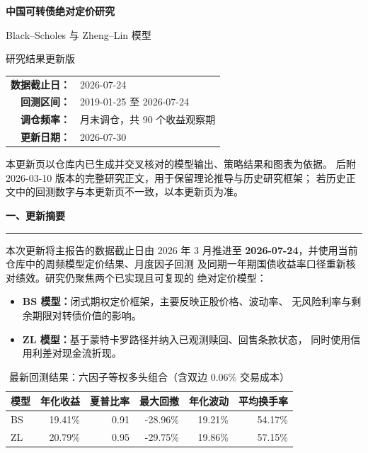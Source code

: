 \documentclass[11pt,a4paper]{ctexart}
\newcommand{\sectionbar}[1]{%
  \vspace{0.4em}
  {\color{navy}\Large\bfseries #1}\par
  \vspace{0.2em}
  {\color{blue}\rule{\textwidth}{1.2pt}}\par
}
\begin{document}
\begin{titlepage}
  \centering
  \vspace*{2.1cm}
  {\color{navy}\Huge\bfseries 中国可转债绝对定价研究\par}
  \vspace{0.45cm}
  {\color{blue}\LARGE Black--Scholes 与 Zheng--Lin 模型\par}
  \vspace{0.9cm}
  {\Large 研究结果更新版\par}
  \vspace{1.5cm}

  \renewcommand{\arraystretch}{1.45}
  \begin{tabular}{>{\bfseries}rl}
    数据截止日： & 2026-07-24 \\
    回测区间： & 2019-01-25 至 2026-07-24 \\
    调仓频率： & 月末调仓，共 90 个收益观察期 \\
    更新日期： & 2026-07-30 \\
  \end{tabular}

  \vfill
  \begin{minipage}{0.88\textwidth}
    \small\color{muted}
    本更新页以仓库内已生成并交叉核对的模型输出、策略结果和图表为依据。
    后附 2026-03-10 版本的完整研究正文，用于保留理论推导与历史研究框架；
    若历史正文中的回测数字与本更新页不一致，以本更新页为准。
  \end{minipage}
\end{titlepage}

\sectionbar{一、更新摘要}

本次更新将主报告的数据截止日由 2026 年 3 月推进至
\textbf{2026-07-24}，并使用当前仓库中的周频模型定价结果、月度因子回测
及同期一年期国债收益率口径重新核对绩效。研究仍聚焦两个已实现且可复现的
绝对定价模型：

\begin{itemize}
  \item \textbf{BS 模型：}闭式期权定价框架，主要反映正股价格、波动率、
        无风险利率与剩余期限对转债价值的影响。
  \item \textbf{ZL 模型：}基于蒙特卡罗路径并纳入已观测赎回、回售条款状态，
        同时使用信用利差对现金流折现。
\end{itemize}

\begin{table}[h]
  \centering
  \caption{最新回测结果：六因子等权多头组合（含双边 0.06\% 交易成本）}
  \begin{tabular}{lrrrrr}
    \toprule
    模型 & 年化收益 & 夏普比率 & 最大回撤 & 年化波动 & 平均换手率 \\
    \midrule
    BS & 19.41\% & 0.91 & -28.96\% & 19.21\% & 54.17\% \\
    ZL & 20.79\% & 0.95 & -29.75\% & 19.86\% & 57.15\% \\
    \bottomrule
  \end{tabular}
\end{table}
\end{document}
